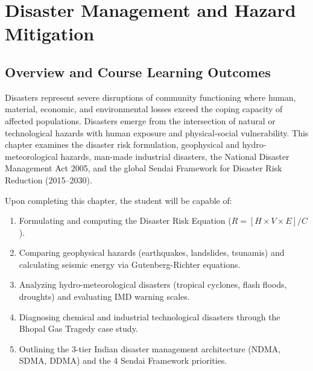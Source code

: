 \chapter{Disaster Management and Hazard Mitigation}
\label{chap:disaster-management}

\section{Overview and Course Learning Outcomes}
Disasters represent severe disruptions of community functioning where human, material, economic, and environmental losses exceed the coping capacity of affected populations. Disasters emerge from the intersection of natural or technological hazards with human exposure and physical-social vulnerability. This chapter examines the disaster risk formulation, geophysical and hydro-meteorological hazards, man-made industrial disasters, the National Disaster Management Act 2005, and the global Sendai Framework for Disaster Risk Reduction (2015--2030).

\begin{important}
Upon completing this chapter, the student will be capable of:
\begin{enumerate}[leftmargin=1.5em]
    \item Formulating and computing the Disaster Risk Equation ($R = [H \times V \times E] / C$).
    \item Comparing geophysical hazards (earthquakes, landslides, tsunamis) and calculating seismic energy via Gutenberg-Richter equations.
    \item Analyzing hydro-meteorological disasters (tropical cyclones, flash floods, droughts) and evaluating IMD warning scales.
    \item Diagnosing chemical and industrial technological disasters through the Bhopal Gas Tragedy case study.
    \item Outlining the 3-tier Indian disaster management architecture (NDMA, SDMA, DDMA) and the 4 Sendai Framework priorities.
\end{enumerate}
\end{important}


